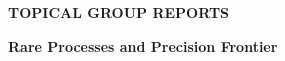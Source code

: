 

  \vfill

\begin{center}
\begin{Huge}   {\bf  TOPICAL GROUP REPORTS}

\bigskip

\bigskip

 {\bf Rare Processes and Precision  Frontier }

\vfill

\vfill

\end{Huge}
\end{center}

\newpage
\thispagestyle{empty}
\mbox{\null}


